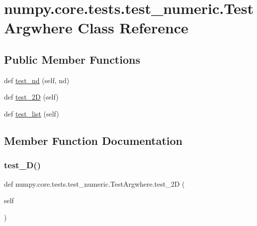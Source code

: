 \hypertarget{classnumpy_1_1core_1_1tests_1_1test__numeric_1_1TestArgwhere}{}\section{numpy.\+core.\+tests.\+test\+\_\+numeric.\+Test\+Argwhere Class Reference}
\label{classnumpy_1_1core_1_1tests_1_1test__numeric_1_1TestArgwhere}
\subsection*{Public Member Functions}
\begin{DoxyCompactItemize}
\item 
def \hyperlink{classnumpy_1_1core_1_1tests_1_1test__numeric_1_1TestArgwhere_ad0051a70c2868f95d526d4a784400b80}{test\+\_\+nd} (self, nd)
\item 
def \hyperlink{classnumpy_1_1core_1_1tests_1_1test__numeric_1_1TestArgwhere_aaff365ea6ad0a2c2f0df3b987acc254f}{test\+\_\+2D} (self)
\item 
def \hyperlink{classnumpy_1_1core_1_1tests_1_1test__numeric_1_1TestArgwhere_a2eecec7826b5088e008274223f2dd7c0}{test\+\_\+list} (self)
\end{DoxyCompactItemize}


\subsection{Member Function Documentation}
\mbox{\label{classnumpy_1_1core_1_1tests_1_1test__numeric_1_1TestArgwhere_aaff365ea6ad0a2c2f0df3b987acc254f}} 
\subsubsection{\texorpdfstring{test\+\_\+D()}{test\_2D()}}
{\footnotesize\ttfamily def numpy.\+core.\+tests.\+test\+\_\+numeric.\+Test\+Argwhere.\+test\+\_\+2D (\begin{DoxyParamCaption}\item[{}]{self }\end{DoxyParamCaption})}

